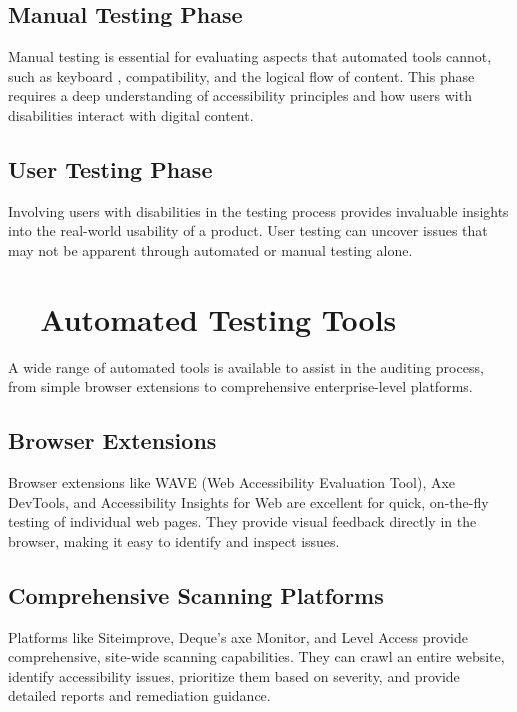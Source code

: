 \subsection{Manual Testing Phase}
\label{subsec:manual-testing-phase}
Manual testing is essential for evaluating aspects that automated tools cannot, such as keyboard ,  compatibility, and the logical flow of content. This phase requires a deep understanding of accessibility principles and how users with disabilities interact with digital content.

\subsection{User Testing Phase}
\label{subsec:user-testing-phase}
Involving users with disabilities in the testing process provides invaluable insights into the real-world usability of a product. User testing can uncover issues that may not be apparent through automated or manual testing alone.
\supercite{Petrie2006}

\section{~~Automated Testing Tools}
\label{sec:automated-tools}
A wide range of automated tools is available to assist in the auditing process, from simple browser extensions to comprehensive enterprise-level platforms.

\subsection{Browser Extensions}
\label{subsec:browser-extensions}
Browser extensions like WAVE (Web Accessibility Evaluation Tool), Axe DevTools, and Accessibility Insights for Web are excellent for quick, on-the-fly testing of individual web pages. They provide visual feedback directly in the browser, making it easy to identify and inspect issues.
\supercite{WebAIMWave, DequeAxeDevTools, MicrosoftInsights}

\subsection{Comprehensive Scanning Platforms}
\label{subsec:scanning-platforms}
Platforms like Siteimprove, Deque's axe Monitor, and Level Access provide comprehensive, site-wide scanning capabilities. They can crawl an entire website, identify accessibility issues, prioritize them based on severity, and provide detailed reports and remediation guidance.
\supercite{SiteimproveAccessibility, DequeWorldSpace, AudioEyeTesting}

